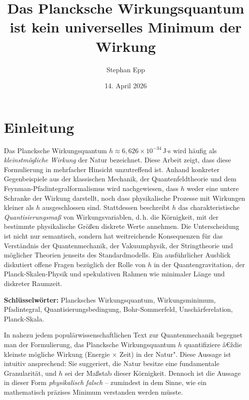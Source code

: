 ﻿\documentclass[12pt,a4paper]{article}
\title{\textbf{Das Plancksche Wirkungsquantum ist kein universelles Minimum der Wirkung}}
\author{Stephan Epp}
\date{14. April 2026}
\theoremstyle{plain}
\theoremstyle{definition}
\theoremstyle{remark}
\begin{document}
\maketitle
\tableofcontents
\newpage

\section{Einleitung}
    Das Plancksche Wirkungsquantum $h \approx 6{,}626 \times 10^{-34}$\,J$\cdot$s wird häufig
als \emph{kleinstmögliche Wirkung} der Natur bezeichnet. Diese Arbeit zeigt, dass diese
Formulierung in mehrfacher Hinsicht unzutreffend ist. Anhand konkreter Gegenbeispiele aus
der klassischen Mechanik, der Quantenfeldtheorie und dem Feynman-Pfadintegralformalismus
wird nachgewiesen, dass $h$ weder eine untere Schranke der Wirkung darstellt, noch dass
physikalische Prozesse mit Wirkungen kleiner als $h$ ausgeschlossen sind. Stattdessen
beschreibt $h$ das charakteristische \emph{Quantisierungsmaß} von Wirkungsvariablen,
d.\,h. die Körnigkeit, mit der bestimmte physikalische Größen diskrete Werte annehmen.
Die Unterscheidung ist nicht nur semantisch, sondern hat weitreichende Konsequenzen für
das Verständnis der Quantenmechanik, der Vakuumphysik, der Stringtheorie und
möglicher Theorien jenseits des Standardmodells. Ein ausführlicher Ausblick diskutiert
offene Fragen bezüglich der Rolle von $h$ in der Quantengravitation, der
Planck-Skalen-Physik und spekulativen Rahmen wie minimaler Länge und diskreter Raumzeit.

\textbf{Schlüsselwörter:} Plancksches Wirkungsquantum, Wirkungsminimum, Pfadintegral,
Quantisierungsbedingung, Bohr-Sommerfeld, Unschärferelation, Planck-Skala.

In nahezu jedem populärwissenschaftlichen Text zur Quantenmechanik begegnet man der Formulierung,
das Plancksche Wirkungsquantum $h$ quantifiziere â€ždie kleinste mögliche Wirkung (Energie $\times$ Zeit)
in der Natur". Diese Aussage ist intuitiv ansprechend: Sie suggeriert, die Natur besitze eine fundamentale
Granularität, und $h$ sei der Maßstab dieser Körnigkeit. Dennoch ist die Aussage in dieser Form
\emph{physikalisch falsch} -- zumindest in dem Sinne, wie ein mathematisch präzises Minimum verstanden werden müsste.
\end{document}
